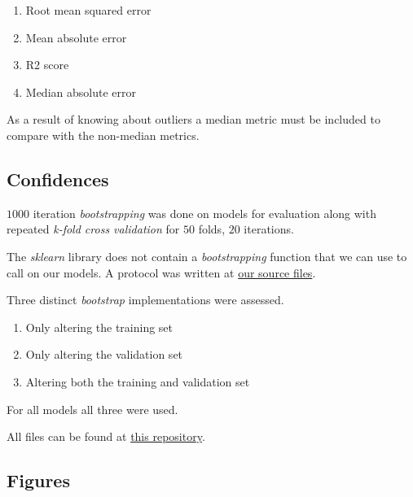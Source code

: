 \documentclass[12pt, a4paper]{article}
\begin{document}
\begin{multicols}{2}
    \begin{enumerate} \label{enm:metrics}
        \item Root mean squared error
        \item Mean absolute error
        \item R2 score
        \item Median absolute error
    \end{enumerate}

    As a result of knowing about outliers a median metric must be included to compare with the non-median metrics.
    \newline

    \subsection{Confidences} \label{subsec:conf}

    $1000$ iteration \textit{bootstrapping} was done on models for evaluation along with repeated \textit{k-fold cross validation} for $50$ folds, $20$ iterations.
    \newline

    The \textit{sklearn} library \cite{noauthor_scikit-learn_nodate} does not contain a \textit{bootstrapping} function that we can use to call on our models. A protocol was written at \href{https://github.com/ArisPodotas/Assignment-1-MLICB/blob/main/src/functions.py}{our source files}.
    \newline

    Three distinct \textit{bootstrap} implementations were assessed.
    \newline

    \begin{enumerate} \label{enm:bootstrap}
        \item Only altering the training set
        \item Only altering the validation set
        \item Altering both the training and validation set
    \end{enumerate}

    For all models all three were used.
    \newline

    All files can be found at \href{https://github.com/ArisPodotas/Assignment-2-MLICB}{this repository}.
    \newline

    \subsection{Figures} \label{subsec:figs}


\end{multicols}
\end{document}
